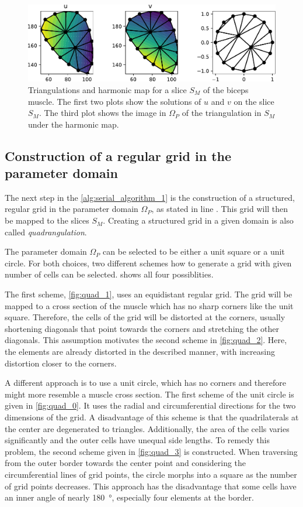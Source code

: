 \begin{figure}%
  \centering%
  \includegraphics[width=\textwidth]{images/fiber_creation/harmonic_map_9b.pdf}%
  \caption{Triangulations and harmonic map for a slice $S_M$ of the biceps muscle. The first two plots show the solutions of $u$ and $v$ on the slice $S_M$. The third plot shows the image in $\Omega_P$ of the triangulation in $S_M$ under the harmonic map.}%
  \label{fig:harmonic_map_solution}%
\end{figure}%

\subsection{Construction of a regular grid in the parameter domain}
The next step in the \cref{alg:serial_algorithm_1} is the construction of a structured, regular grid in the parameter domain $\Omega_P$, as stated in line . This grid will then be mapped to the slices $S_M$. Creating a structured grid in a given domain is also called \emph{quadrangulation}.

The parameter domain $\Omega_P$ can be selected to be either a unit square or a unit circle. For both choices, two different schemes how to generate a grid with given number of cells can be selected.
 shows all four possiblities.

The first scheme, \cref{fig:quad_1}, uses an equidistant regular grid. The grid will be mapped to a cross section of the muscle which has no sharp corners like the unit square. Therefore, the cells of the grid will be distorted at the corners, usually shortening diagonals that point towards the corners and stretching the other diagonals. This assumption motivates the second scheme in \cref{fig:quad_2}. Here, the elements are already distorted in the described manner, with increasing distortion closer to the corners.

A different approach is to use a unit circle, which has no corners and therefore might more resemble a muscle cross section. The first scheme of the unit circle is given in \cref{fig:quad_0}. It uses the radial and circumferential directions for the two dimensions of the grid. A disadvantage of this scheme is that the quadrilaterals at the center are degenerated to triangles. Additionally, the area of the cells varies significantly and the outer cells have unequal side lengths. To remedy this problem, the second scheme given in \cref{fig:quad_3} is constructed. When traversing from the outer border towards the center point and considering the circumferential lines of grid points, the circle morphs into a square as the number of grid points decreases. This approach has the disadvantage that some cells have an inner angle of nearly \SI{180}{\degree}, especially four elements at the border.

